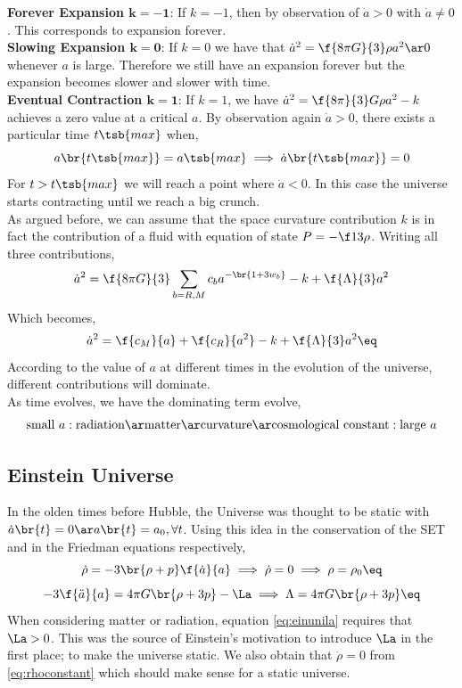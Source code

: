 \documentclass{article}
\begin{document}
\textbf{Forever Expansion $\mathbf{k = -1}$}: If $k=-1$, then by observation of $\dot{a} > 0$ with $\dot{a} \neq 0$. This corresponds to expansion forever.\\

\textbf{Slowing Expansion $\mathbf{k = 0}$}: If $k = 0$ we have that $\dot{a}^2 = \f{8 \pi G}{3} \rho a^2 \ar 0$ whenever $a$ is large. Therefore we still have an expansion forever but the expansion becomes slower and slower with time.\\

\textbf{Eventual Contraction $\mathbf{k = 1}$}: If $k=1$, we have $\dot{a}^2 = \f{8\pi}{3}G \rho a^2 - k$ achieves a zero value at a critical $a$. By observation again $\dot{a} > 0$, there exists a particular time $t\tsb{max}$ when,
\[ a\br{t\tsb{max}} = a\tsb{max}  \implies \dot{a}\br{t\tsb{max}} = 0 \]
For $t > t\tsb{max} $ we will reach a point where $\dot{a} < 0$. In this case the universe starts contracting until we reach a big crunch.\\

As argued before, we can assume that the space curvature contribution $k$ is in fact the contribution of a fluid with equation of state $P = -\f13 \rho$. Writing all three contributions,
\[ \dot{a}^2 = \f{8\pi G}{3}\sum_{b=R,M}c_b a^{-\br{1 + 3 w_b}} - k + \f{\Lambda}{3}a^2 \]
Which becomes,
\[ \dot{a}^2 = \f{c_M}{a} + \f{c_R}{a^2} - k + \f{\Lambda}{3}a^2 \eq \label{eq:add} \]
According to the value of $a$ at different times in the evolution of the universe, different contributions will dominate. \\

As time evolves, we have the dominating term evolve,
\[ \text{small } a : \text{radiation} \ar \text{matter} \ar \text{curvature} \ar \text{cosmological constant} : \text{large } a \]
\subsection{Einstein Universe}
In the olden times before Hubble, the Universe was thought to be static with $\dot{a}\br{t} = 0 \ar a\br{t} = a_0, \forall t$. Using this idea in the conservation of the SET and in the Friedman equations respectively,
\[ \dot{\rho} = - 3 \br{\rho + p}\f{\dot{a}}{a} \implies \dot{\rho} = 0 \implies \rho = \rho_0 \eq \label{eq:rhoconstant}\]
\[ -3\f{\ddot{a}}{a} = 4 \pi G \br{\rho + 3p} - \La \implies \Lambda = 4 \pi G \br{\rho + 3 p} \eq \label{eq:einunila} \]
When considering matter or radiation, equation \eqref{eq:einunila} requires that $\La > 0$. This was the source of Einstein's motivation to introduce $\La$ in the first place; to make the universe static. We also obtain that $\dot{\rho} = 0$ from \eqref{eq:rhoconstant} which should make sense for a static universe. \\
\end{document}

